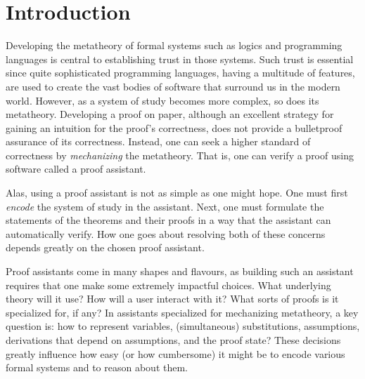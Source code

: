 \chapter{Introduction}
\label{chap:introduction}

Developing the metatheory of formal systems such as logics and programming
languages is central to establishing trust in those systems.
Such trust is essential since quite sophisticated programming languages, having
a multitude of features, are used to create the vast bodies of software that
surround us in the modern world.
However, as a system of study becomes more complex, so does its metatheory.
Developing a proof on paper, although an excellent strategy for gaining an
intuition for the proof's correctness, does not provide a bulletproof assurance
of its correctness.
Instead, one can seek a higher standard of correctness by \emph{mechanizing} the
metatheory.
That is, one can verify a proof using software called a proof assistant.

Alas, using a proof assistant is not as simple as one might hope.
One must first \emph{encode} the system of study in the assistant.
Next, one must formulate the statements of the theorems and their proofs in a
way that the assistant can automatically verify.
How one goes about resolving both of these concerns depends greatly on the
chosen proof assistant.

Proof assistants come in many shapes and flavours, as building such an
assistant requires that one make some extremely impactful choices.
What underlying theory will it use?
How will a user interact with it?
What sorts of proofs is it specialized for, if any?
In assistants specialized for mechanizing metatheory, a key question is:
how to represent variables, (simultaneous) substitutions, assumptions,
derivations that depend on assumptions, and the proof state?
These decisions greatly influence how easy (or how cumbersome) it might be to
encode various formal systems and to reason about them.

%

